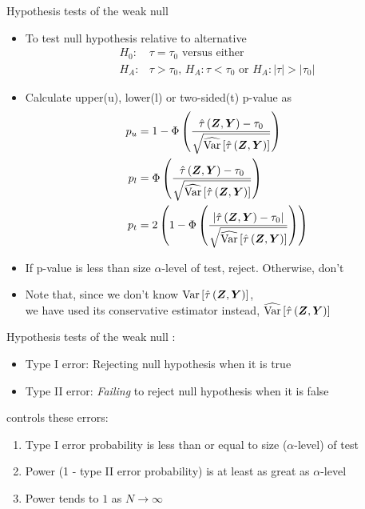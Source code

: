 \documentclass[table, xcolor = {dvipsnames}, 9pt]{beamer}
\theoremstyle{plain}
\newcommand{\bh}[1]{{\color{blue}{#1}}}
\DeclareMathOperator{\Var}{\rm{Var}}
\begin{document}
\begin{frame}{Hypothesis tests of the weak null}
\begin{itemize}
\item To test null hypothesis relative to alternative
\begin{align*}
H_0: & \tau = \tau_0 \text{ versus either } \\
H_A: & \tau > \tau_0, \, H_A: \tau < \tau_0 \text{ or } H_A: \left\lvert \tau \right\rvert > \left\lvert \tau_0 \right \rvert
\end{align*} \pause
\item Calculate upper(u), lower(l) or two-sided(t) p-value as
\begin{align*}
p_u & =  1 - \Phi\left(\frac{\hat{\tau}\left(\bm{Z}, \bm{Y}\right) - \tau_0}{\sqrt{\widehat{\Var}\left[\hat{\tau}\left(\bm{Z}, \bm{Y}\right)\right]}}\right) \\
p_l & =  \Phi\left(\frac{\hat{\tau}\left(\bm{Z}, \bm{Y}\right) - \tau_0}{\sqrt{\widehat{\Var}\left[\hat{\tau}\left(\bm{Z}, \bm{Y}\right)\right]}}\right) \\
p_t & = 2\left(1 - \Phi\left(\frac{\left\lvert\hat{\tau}\left(\bm{Z}, \bm{Y}\right) - \tau_0\right\rvert}{\sqrt{\widehat{\Var}\left[\hat{\tau}\left(\bm{Z}, \bm{Y}\right)\right]}}\right)\right)
\end{align*} \pause
\item If p-value is less than size $\alpha$-level of test, reject. Otherwise, don't
\item Note that, since we don't know $\Var\left[\hat{\tau}\left(\bm{Z}, \bm{Y}\right)\right]$, \\ we have used its conservative estimator instead, $\widehat{\Var}\left[\hat{\tau}\left(\bm{Z}, \bm{Y}\right)\right]$
\end{itemize}
\end{frame}
\begin{frame}{Hypothesis tests of the weak null}
\bh{Hypothesis tests susceptible to two errors}:
\begin{itemize}
\item Type I error: Rejecting null hypothesis when it is true
\item Type II error: \textit{Failing} to reject null hypothesis when it is false
\end{itemize} \pause
\bh{A good test} controls these errors:
\begin{enumerate}
\item Type I error probability is less than or equal to size ($\alpha$-level) of test
\item Power (1 - type II error probability) is at least as great as $\alpha$-level
\item Power tends to $1$ as $N \to \infty$
\end{enumerate}
\end{frame}
\end{document}
